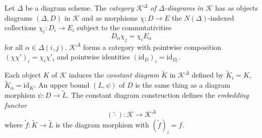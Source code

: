 Let $\Delta$ be a diagram scheme. The \textit{category $\mathcal{K}^{\Delta}$ of $\Delta$-diagrams in $\mathcal{K}$} has as objects diagrams $(\Delta, D)$ in $\mathcal{K}$ and as morphisms $\chi: D \longrightarrow E$ the $N(\Delta)$-indexed collections $\chi_i: D_i \longrightarrow E_i$ subject to the commutativities
$$D_{\alpha} \chi_j = \chi_i E_{\alpha}$$
for all $\alpha \in \Delta(i, j)$. $\mathcal{K}^{\Delta}$ forms a category with pointwise composition $(\chi \chi')_i = \chi_i \chi'_i$ and pointwise identities $(\mathrm{id}_D)_i = \mathrm{id}_{D_i}$.

Each object $K$ of $\mathcal{K}$ induces the \textit{constant diagram} $\tilde{K}$ in $\mathcal{K}^{\Delta}$ defined by $\tilde{K}_i = K$, $\tilde{K}_{\alpha} = \mathrm{id}_K$. An upper bound $(L, \psi)$ of $D$ is the same thing as a diagram morphism $\psi: D \longrightarrow \tilde{L}$. The constant diagram construction defines the \textit{embedding functor}
$$(\tilde{\cdot}): \mathcal{K} \longrightarrow \mathcal{K}^{\Delta}$$
where $\tilde{f}: \tilde{K} \longrightarrow \tilde{L}$ is the diagram morphism with $(\tilde{f})_i = f$.
